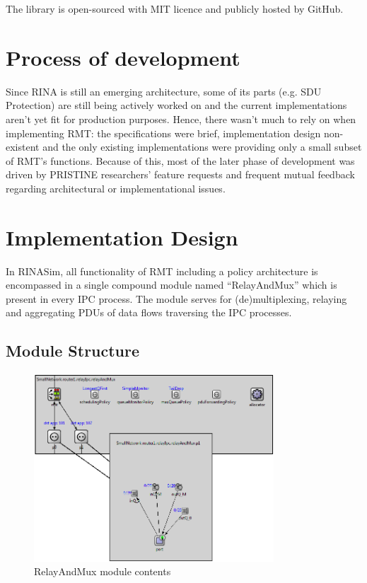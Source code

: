         The library is open-sourced with MIT licence and publicly hosted by GitHub.

    \section{Process of development}
        Since RINA is still an emerging architecture, some of its parts (e.g. SDU Protection) are still being actively worked on and the current implementations aren't yet fit for production purposes. Hence, there wasn't much to rely on when implementing RMT: the specifications were brief, implementation design non-existent and the only existing implementations were providing only a small subset of RMT's functions. Because of this, most of the later phase of development was driven by PRISTINE researchers' feature requests and frequent mutual feedback regarding architectural or implementational issues.

    \section{Implementation Design}

        In RINASim, all functionality of RMT including a policy architecture is encompassed in a single compound module named ``RelayAndMux'' which is present in every IPC process. The module serves for (de)multiplexing, relaying and aggregating PDUs of data flows traversing the IPC processes.

        \subsection{Module Structure}

            \begin{figure}[H]
                \begin{center}
                    \includegraphics[width=0.8\textwidth]{fig/rmt_all.png}
                  \caption{RelayAndMux module contents}
                  \label{omnet-rmt}
                \end{center}
            \end{figure}

